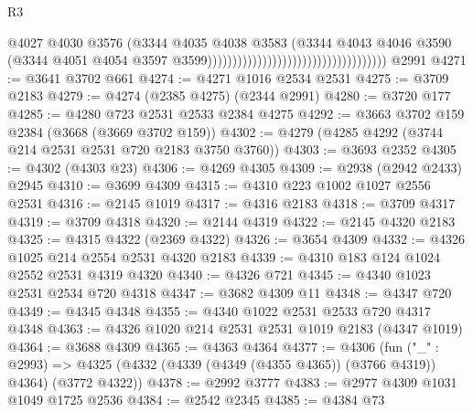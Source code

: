 \begin{lexlean}{R3}
\begin{coremodule}
                                                                      @4027
                                                                      @4030
                                                                      @3576
                                                                      (@3344
                                                                        @4035
                                                                        @4038
                                                                        @3583
                                                                        (@3344
                                                                          @4043
                                                                          @4046
                                                                          @3590
                                                                          (@3344
                                                                            @4051
                                                                            @4054
                                                                            @3597
                                                                            @3599))))))))))))))))))))))))))))))))))))
    @2991
@4271 := @3641 @3702 @661
@4274 := @4271 @1016 @2534 @2531
@4275 := @3709 @2183
@4279 := @4274 (@2385 @4275) (@2344 @2991)
@4280 := @3720 @177
@4285 := @4280 @723 @2531 @2533 @2384 @4275
@4292 := @3663 @3702 @159 @2384 (@3668 (@3669 @3702 @159))
@4302 := @4279 (@4285 @4292 (@3744 @214 @2531 @2531 @720 @2183 @3750 @3760))
@4303 := @3693 @2352
@4305 := @4302 (@4303 @23)
@4306 := @4269 @4305
@4309 := @2938 (@2942 @2433) @2945
@4310 := @3699 @4309
@4315 := @4310 @223 @1002 @1027 @2556 @2531
@4316 := @2145 @1019
@4317 := @4316 @2183
@4318 := @3709 @4317
@4319 := @3709 @4318
@4320 := @2144 @4319
@4322 := @2145 @4320 @2183
@4325 := @4315 @4322 (@2369 @4322)
@4326 := @3654 @4309
@4332 := @4326 @1025 @214 @2554 @2531 @4320 @2183
@4339 := @4310 @183 @124 @1024 @2552 @2531 @4319 @4320
@4340 := @4326 @721
@4345 := @4340 @1023 @2531 @2534 @720 @4318
@4347 := @3682 @4309 @11
@4348 := @4347 @720
@4349 := @4345 @4348
@4355 := @4340 @1022 @2531 @2533 @720 @4317 @4348
@4363 := @4326 @1020 @214 @2531 @2531 @1019 @2183 (@4347 @1019)
@4364 := @3688 @4309
@4365 := @4363 @4364
@4377 := @4306
    (fun ("_" : @2993) =>
    @4325 (@4332 (@4339 (@4349 (@4355 @4365)) (@3766 @4319)) @4364) (@3772 @4322))
@4378 := @2992 @3777
@4383 := @2977 @4309 @1031 @1049 @1725 @2536
@4384 := @2542 @2345
@4385 := @4384 @73

\end{coremodule}
\end{lexlean}

